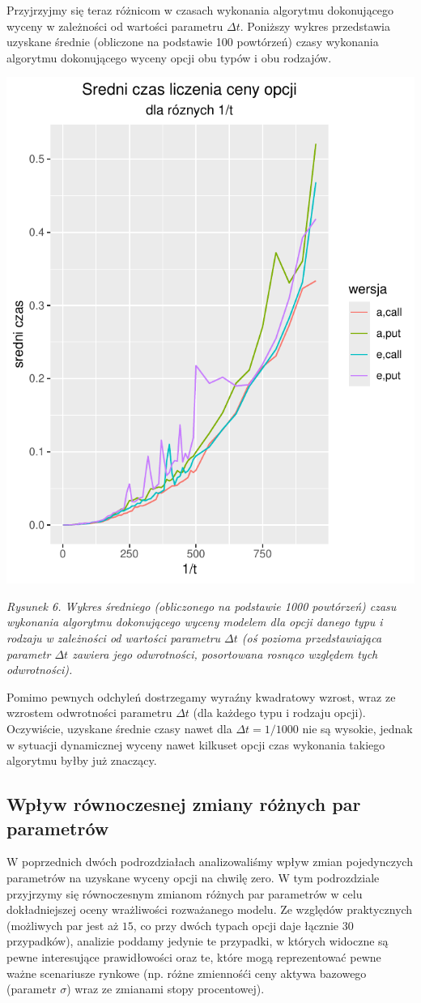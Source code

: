 \documentclass[
]{article}
\begin{document}
Przyjrzyjmy się teraz różnicom w czasach wykonania algorytmu
dokonującego wyceny w zależności od wartości parametru \(\Delta t\).
Poniższy wykres przedstawia uzyskane średnie (obliczone na podstawie 100
powtórzeń) czasy wykonania algorytmu dokonującego wyceny opcji obu typów
i obu rodzajów.

\begin{center}\includegraphics[width=0.4\linewidth]{wykresy/sredni_czas} \end{center}

\emph{Rysunek 6. Wykres średniego (obliczonego na podstawie 1000
powtórzeń) czasu wykonania algorytmu dokonującego wyceny modelem dla
opcji danego typu i rodzaju w zależności od wartości parametru
\(\Delta t\) (oś pozioma przedstawiająca parametr \(\Delta t\) zawiera
jego odwrotności, posortowana rosnąco względem tych odwrotności).}

Pomimo pewnych odchyleń dostrzegamy wyraźny kwadratowy wzrost, wraz ze
wzrostem odwrotności parametru \(\Delta t\) (dla każdego typu i rodzaju
opcji). Oczywiście, uzyskane średnie czasy nawet dla
\(\Delta t = 1/1000\) nie są wysokie, jednak w sytuacji dynamicznej
wyceny nawet kilkuset opcji czas wykonania takiego algorytmu byłby już
znaczący.

\hypertarget{wpux142yw-ruxf3wnoczesnej-zmiany-ruxf3ux17cnych-par-parametruxf3w}{%
\subsection{Wpływ równoczesnej zmiany różnych par
parametrów}\label{wpux142yw-ruxf3wnoczesnej-zmiany-ruxf3ux17cnych-par-parametruxf3w}}

W poprzednich dwóch podrozdziałach analizowaliśmy wpływ zmian
pojedynczych parametrów na uzyskane wyceny opcji na chwilę zero. W tym
podrozdziale przyjrzymy się równoczesnym zmianom różnych par parametrów
w celu dokładniejszej oceny wrażliwości rozważanego modelu. Ze względów
praktycznych (możliwych par jest aż \(15\), co przy dwóch typach opcji
daje łącznie 30 przypadków), analizie poddamy jedynie te przypadki, w
których widoczne są pewne interesujące prawidłowości oraz te, które mogą
reprezentować pewne ważne scenariusze rynkowe (np. różne zmiennośći ceny
aktywa bazowego (parametr \(\sigma\)) wraz ze zmianami stopy
procentowej).
\end{document}
